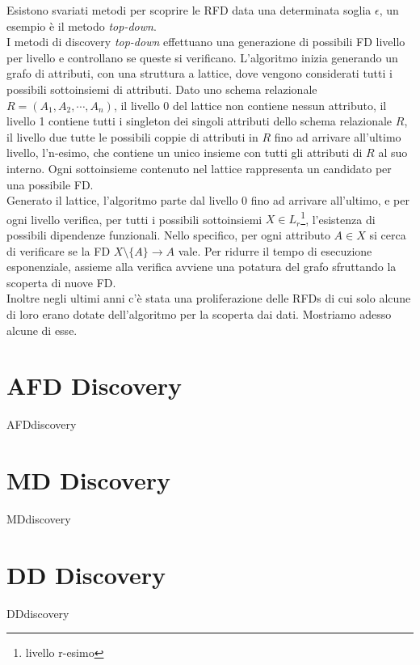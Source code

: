 Esistono svariati metodi per scoprire le RFD data una determinata soglia $\epsilon$, un esempio è il metodo \textit{top-down}.\\
I metodi di discovery \textit{top-down} effettuano una generazione di possibili FD livello per livello e controllano se queste si verificano. L'algoritmo inizia generando un grafo di attributi, con una struttura a lattice, dove vengono considerati tutti i possibili sottoinsiemi di attributi. Dato uno schema relazionale $R = (A_1, A_2, \cdots, A_n)$, il livello 0 del lattice non contiene nessun attributo, il livello 1 contiene tutti i singleton dei singoli attributi dello schema relazionale $R$, il livello due tutte le possibili coppie di attributi in $R$ fino ad arrivare all'ultimo livello, l'n-esimo, che contiene un unico insieme con tutti gli attributi di $R$ al suo interno. Ogni sottoinsieme contenuto nel lattice rappresenta un candidato per una possibile FD.\\
Generato il lattice, l'algoritmo parte dal livello 0 fino ad arrivare all'ultimo, e per ogni livello verifica, per tutti i possibili sottoinsiemi $X \in L_r$\footnote{livello r-esimo}, l'esistenza di possibili dipendenze funzionali. Nello specifico, per ogni attributo $A \in X$ si cerca di verificare se la FD $X \setminus \{A\} \rightarrow A$ vale. Per ridurre il tempo di esecuzione esponenziale, assieme alla verifica avviene una potatura del grafo sfruttando la scoperta di nuove FD.\\
Inoltre negli ultimi anni c'è stata una proliferazione delle RFDs di cui solo alcune di loro erano dotate dell'algoritmo per la scoperta dai dati. Mostriamo adesso alcune di esse\cite{onDiscovery}.


\section{AFD Discovery}
{AFDdiscovery}
\section{MD Discovery}
{MDdiscovery}
\section{DD Discovery}
{DDdiscovery}